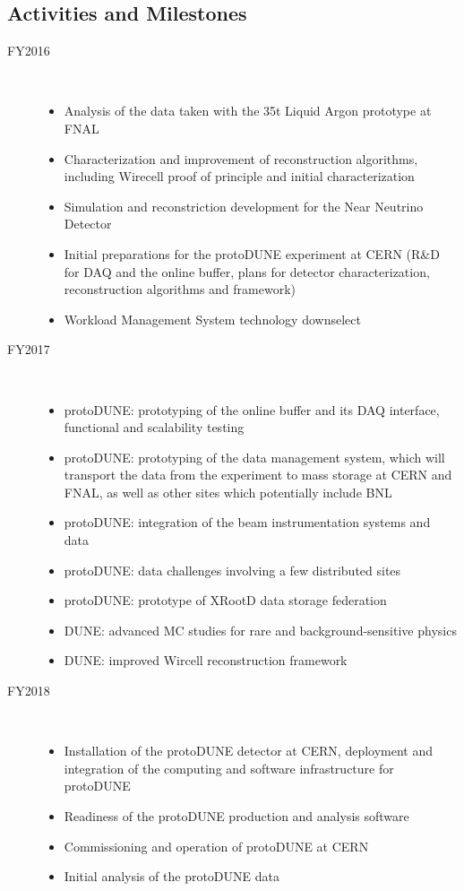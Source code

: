 \documentclass[pdftex,12pt,letter]{article}
\begin{document}
\subsection{Activities and Milestones}
\begin{description}
\item[FY2016] \
\begin{itemize}
\item Analysis of the data taken with the 35t Liquid Argon prototype at FNAL
\item Characterization and improvement of reconstruction algorithms, including Wirecell proof of principle and initial characterization
\item Simulation and reconstriction development for the Near Neutrino Detector
\item Initial preparations for the protoDUNE experiment at CERN (R\&D for DAQ and the online buffer, plans for detector characterization, reconstruction algorithms and framework)
\item Workload Management System technology downselect
\end{itemize}
\item[FY2017] \
\begin{itemize}
\item protoDUNE: prototyping of the online buffer and its DAQ interface, functional and scalability testing
\item protoDUNE: prototyping of the data management system, which will transport the data from the experiment to mass storage at CERN and FNAL, as well as other sites which potentially include BNL
\item protoDUNE: integration of the beam instrumentation systems and data
\item protoDUNE: data challenges involving a few distributed sites
\item protoDUNE: prototype of XRootD data storage federation
\item DUNE: advanced MC studies for rare and background-sensitive physics
\item DUNE: improved Wircell reconstruction framework
\end{itemize}

\item[FY2018] \
\begin{itemize}
\item Installation of the protoDUNE detector at CERN, deployment and integration of the computing and software infrastructure for protoDUNE
\item Readiness of the protoDUNE production and analysis software
\item Commissioning and operation of protoDUNE at CERN
\item Initial analysis of the protoDUNE data
\end{itemize}


\end{description}
\end{document}
